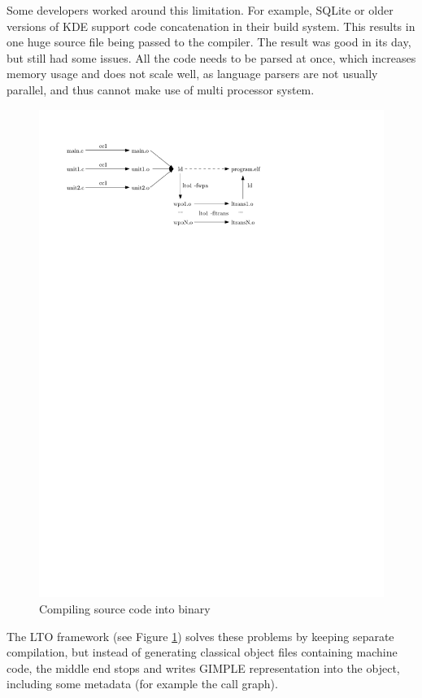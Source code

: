 Some developers worked around this limitation. For example, SQLite or older versions
of KDE support code concatenation in their build system. This results in one
huge source file being passed to the compiler. The result was good in its day,
but still had some issues. All the code needs to be parsed at once, which
increases memory usage and does not scale well, as language parsers are not
usually parallel, and thus cannot make use of multi processor system.

\begin{figure}[h!]
	\centering
	\includegraphics{./img/lto-workflow.pdf}
	\caption{Compiling source code into binary}
	\label{figure-lto-workflow}
\end{figure}

The LTO framework (see Figure \ref{figure-lto-workflow}) solves these problems by keeping separate compilation, but
instead of generating classical object files containing machine code, the
middle end stops and writes GIMPLE representation into the object, including
some metadata (for example the call graph).

